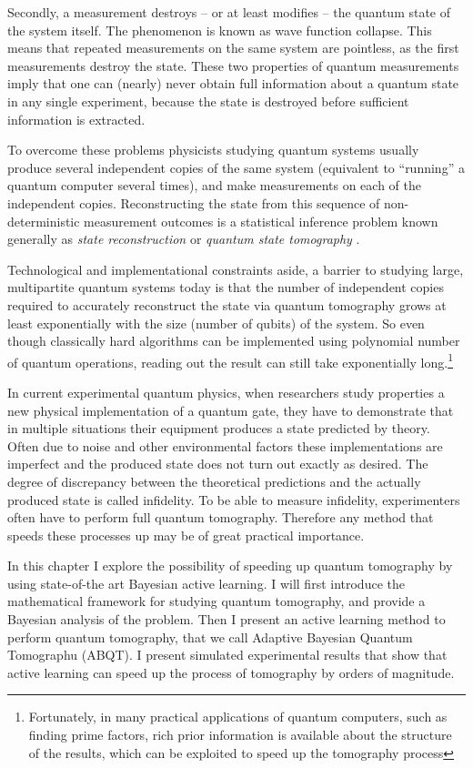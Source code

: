 Secondly, a measurement destroys -- or at least modifies -- the quantum state of the system itself. The phenomenon is known as wave function collapse. This means that repeated measurements on the same system are pointless, as the first measurements destroy the state. These two properties of quantum measurements imply that one can (nearly) never obtain full information about a quantum state in any single experiment, because the state is destroyed before sufficient information is extracted.

To overcome these problems physicists studying quantum systems usually produce several independent copies of the same system (equivalent to ``running'' a quantum computer several times), and make measurements on each of the independent copies. Reconstructing the state from this sequence of non-deterministic measurement outcomes is a statistical inference problem known generally as \emph{state reconstruction} or \emph{quantum state tomography} \citep{Artiles2005}.

Technological and implementational constraints aside, a barrier to studying large, multipartite quantum systems today is that the number of independent copies required to accurately reconstruct the state via quantum tomography grows at least exponentially with the size (number of qubits) of the system. So even though classically hard algorithms can be implemented using polynomial number of quantum operations, reading out the result can still take exponentially long.\footnote{Fortunately, in many practical applications of quantum computers, such as finding prime factors, rich prior information is available about the structure of the results, which can be exploited to speed up the tomography process}

In current experimental quantum physics, when researchers study properties a new physical implementation of a quantum gate, they have to demonstrate that in multiple situations their equipment produces a state predicted by theory. Often due to noise and other environmental factors these implementations are imperfect and the produced state does not turn out exactly as desired. The degree of discrepancy between the theoretical predictions and the actually produced state is called infidelity. To be able to measure infidelity, experimenters often have to perform full quantum tomography. Therefore any method that speeds these processes up may be of great practical importance.

In this chapter I explore the possibility of speeding up quantum tomography by using state-of-the art Bayesian active learning. I will first introduce the mathematical framework for studying quantum tomography, and provide a Bayesian analysis of the problem. Then I present an active learning method to perform quantum tomography, that we call Adaptive Bayesian Quantum Tomographu (ABQT). I present simulated experimental results that show that active learning can speed up the process of tomography by orders of magnitude.

